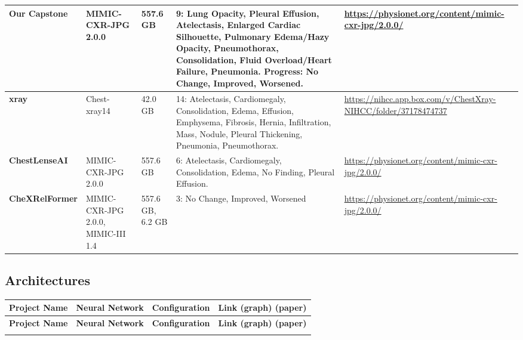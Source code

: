 \documentclass[12pt, titlepage]{article}
\begin{document}
\begin{landscape}
\begin{longtable}{|l|p{3.5cm}|p{1.8cm}|p{6cm}|p{4cm}|}
\textbf{Our Capstone}    & MIMIC-CXR-JPG 2.0.0                                                                                           & 557.6 GB                                                   & 9: Lung Opacity, Pleural Effusion, Atelectasis, Enlarged Cardiac Silhouette, Pulmonary Edema/Hazy Opacity, Pneumothorax, Consolidation, Fluid Overload/Heart Failure, Pneumonia. \textbf{Progress}: No Change, Improved, Worsened. & \url{https://physionet.org/content/mimic-cxr-jpg/2.0.0/}        \\ \hline
\textbf{xray}           & Chest-xray14                                                                                                  & 42.0 GB                                                    & 14: Atelectasis, Cardiomegaly, Consolidation, Edema, Effusion, Emphysema, Fibrosis, Hernia, Infiltration, Mass, Nodule, Pleural Thickening, Pneumonia, Pneumothorax.                                                     & \url{https://nihcc.app.box.com/v/ChestXray-NIHCC/folder/37178474737} \\ \hline
\textbf{ChestLenseAI}   & MIMIC-CXR-JPG 2.0.0                                                                                           & 557.6 GB                                                   & 6: Atelectasis, Cardiomegaly, Consolidation, Edema, No Finding, Pleural Effusion.                                                              & \url{https://physionet.org/content/mimic-cxr-jpg/2.0.0/}        \\ \hline
\textbf{CheXRelFormer}  & MIMIC-CXR-JPG 2.0.0, MIMIC-III 1.4                                                                           & 557.6 GB, 6.2 GB                                          & 3: No Change, Improved, Worsened                                                                                                                                                                                                            & \url{https://physionet.org/content/mimic-cxr-jpg/2.0.0/}        \\
\end{longtable}

\subsection{Architectures}

\begin{longtable}{|l|l|l|p{10cm}|}
\hline
\textbf{Project Name}   & \textbf{Neural Network}  & \textbf{Configuration}  & \textbf{Link (graph) (paper)}  \\ \hline
\endfirsthead
\hline
\textbf{Project Name}   & \textbf{Neural Network}  & \textbf{Configuration}  & \textbf{Link (graph) (paper)}  \\ \hline
\endhead
\hline
\endfoot


\end{longtable}
\end{landscape}
\end{document}
